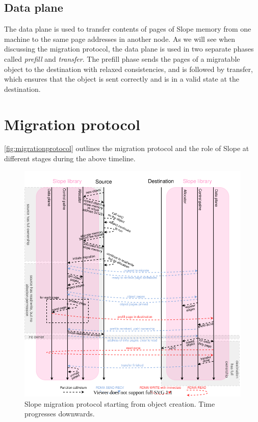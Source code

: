 \subsection{Data plane}
The data plane is used to transfer contents of pages of Slope
memory from one machine to the same page addresses in another node. As we
will see when discussing the migration protocol, the data plane is used
in two separate phases called \emph{prefill} and \emph{transfer}. The prefill
phase sends the pages of a migratable object to the destination with
relaxed consistencies, and is followed by transfer, which ensures that the
object is sent correctly and is in a valid state at the destination.



\section{Migration protocol}
\label{sec:migrationprotocol}

\autoref{fig:migrationprotocol} outlines the migration protocol and the role
of Slope at different stages during the above timeline.

\begin{figure}[tp]
\centering

\includegraphics[width=1\textwidth]{migration-protocol.drawio}
\caption{
    Slope migration protocol starting from object creation. Time progresses
    downwards.
}
\label{fig:migrationprotocol}
\end{figure}


